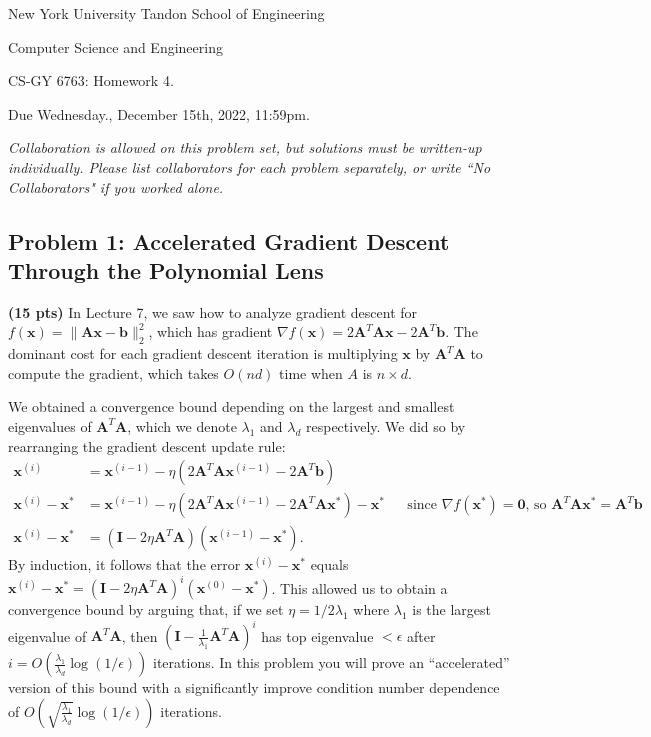 \documentclass[10pt]{article}
\newcommand{\bv}[1]{\mathbf{#1}}
\begin{document}
	
\begin{center}
	\normalsize
	New York University Tandon School of Engineering
	
	Computer Science and Engineering
	\medskip
	
	\large
	CS-GY 6763: Homework 4. 
	
	Due Wednesday., December 15th, 2022, 11:59pm.
	\medskip
	
	\normalsize 
	\noindent \emph{Collaboration is allowed on this problem set, but solutions must be written-up individually. Please list collaborators for each problem separately, or write ``No Collaborators" if you worked alone.}
	\medskip
\end{center} 

\subsection{Problem 1: Accelerated Gradient Descent Through the Polynomial Lens}
\textbf{(15 pts)}
In Lecture 7, we saw how to analyze gradient descent for $f(\bv{x}) = \|\bv{A}\bv{x} - \bv{b}\|_2^2$, which has gradient $\nabla f(\bv{x}) = 2\bv{A}^T\bv{A}\bv{x} - 2\bv{A}^T\bv{b}$. The dominant cost for each gradient descent iteration is multiplying $\bv{x}$ by $\bv{A}^T\bv{A}$ to compute the gradient, which takes $O(nd)$ time when $A$ is $n\times d$. 

We obtained a convergence bound depending on the largest and smallest eigenvalues of $\bv{A}^T\bv{A}$, which we denote $\lambda_1$ and $\lambda_d$ respectively. We did so by rearranging the gradient descent update rule:
\begin{align*}
	\bv{x}^{(i)} &= \bv{x}^{(i-1)} - \eta\left(2\bv{A}^T\bv{A}\bv{x}^{(i-1)} - 2\bv{A}^T\bv{b}\right) \\
	\bv{x}^{(i)} - \bv{x}^* &= \bv{x}^{(i-1)} - \eta\left(2\bv{A}^T\bv{A}\bv{x}^{(i-1)} - 2\bv{A}^T\bv{A}\bv{x}^*\right) -\bv{x}^*&& \text{since $\nabla f(\bv{x}^*)=\bv{0}$, so $\bv{A}^T\bv{A}\bv{x}^* = \bv{A}^T\bv{b}$}\\
	\bv{x}^{(i)} - \bv{x}^* &= (\bv{I} - 2\eta\bv{A}^T\bv{A})(\bv{x}^{(i-1)} - \bv{x}^*).
\end{align*}
By induction, it follows that the error $\bv{x}^{(i)} - \bv{x}^*$ equals $\bv{x}^{(i)} - \bv{x}^* = (\bv{I} - 2\eta\bv{A}^T\bv{A})^i(\bv{x}^{(0)} - \bv{x}^*)$. This allowed us to obtain a convergence bound by arguing that, if we set $\eta = 1/2\lambda_1$ where $\lambda_1$ is the largest eigenvalue of $\bv{A}^T\bv{A}$, then $(\bv{I} - \frac{1}{\lambda_1}\bv{A}^T\bv{A})^i$ has top eigenvalue $< \epsilon$ after $i = O(\frac{\lambda_1}{\lambda_d}\log(1/\epsilon))$ iterations. In this problem you will prove an ``accelerated'' version of this bound with a significantly improve condition number dependence of $O(\sqrt{\frac{\lambda_1}{\lambda_d}} \log(1/\epsilon))$ iterations.  
\end{document}
